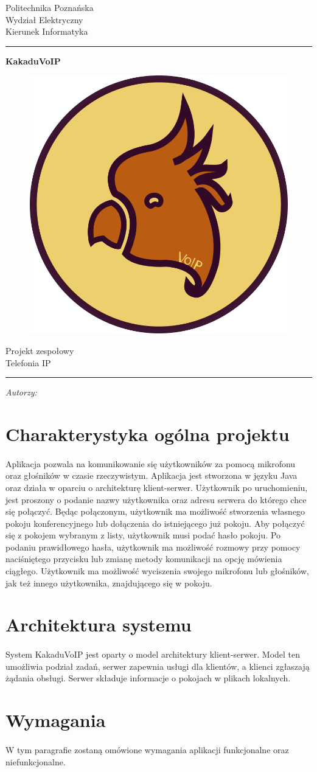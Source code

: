 \documentclass{article}
\author{\Large{Szymon Zieliński \\[0.2cm] szymon.r.zielinski@gmail.com \\[0.2cm] 126812\\[0.4cm] Oskar Rutkowski \\[0.2cm] oskar.rutkowski@student.put.poznan.pl \\[0.2cm] 126845} }
\makeatletter
\newcommand{\linia}{\rule{\linewidth}{0.5mm}}
\renewcommand{\maketitle}{\begin{titlepage}
		
		\vspace*{1cm}
		
		\begin{center}\small
			
			Politechnika Poznańska\\
			
			Wydział Elektryczny\\
			
			Kierunek Informatyka
			
		\end{center}
		
		\vspace{2cm}
		
		\linia
		
		\begin{center}
			
			\LARGE {\textbf{KakaduVoIP} \\[1cm]}
			\begin{figure}[h]
				\centering
				\includegraphics[scale=0.2]{Kakadu}
			\end{figure}
		  \LARGE {Projekt zespołowy  \\ Telefonia IP}
			
		\end{center}
		
		\linia
		
		\vspace{3cm}
		
		\begin{flushright}
			
			\begin{minipage}{15cm}
				
				\textit{ \Large{Autorzy:}}\\
				
				\normalsize{\@author} \par
				
			\end{minipage}
			
		\end{flushright}
		
		\vspace*{\stretch{6}}
		
		\begin{center}
			
			\@date
			
		\end{center}
		
	\end{titlepage}%
	
}
\makeatother
\begin{document}
	
	\maketitle
	\newpage
	\tableofcontents
	\newpage
	
	\section{Charakterystyka ogólna projektu}
	\paragraph*{} Aplikacja pozwala na komunikowanie się użytkowników za pomocą mikrofonu oraz głośników w czasie rzeczywistym. Aplikacja jest stworzona w języku Java oraz działa w oparciu o architekturę klient-serwer. Użytkownik po uruchomieniu, jest proszony o podanie nazwy użytkownika oraz adresu serwera  do którego chce się połączyć. Będąc połączonym, użytkownik ma możliwość stworzenia własnego pokoju konferencyjnego lub dołączenia do istniejącego już pokoju. Aby połączyć się z pokojem wybranym z listy, użytkownik musi podać hasło pokoju. Po podaniu prawidłowego hasła, użytkownik ma możliwość rozmowy przy pomocy naciśniętego przycisku lub zmianę metody komunikacji na opcję mówienia ciągłego. Użytkownik ma możliwość wyciszenia swojego mikrofonu lub głośników, jak też innego użytkownika, znajdującego się w pokoju.
	\section{Architektura systemu}
	\paragraph*{} System KakaduVoIP jest oparty o model architektury klient-serwer. Model ten umożliwia podział zadań, serwer zapewnia usługi dla klientów, a klienci zgłaszają żądania obsługi. Serwer składuje informacje o pokojach w plikach lokalnych.
	\section{Wymagania}
	\paragraph*{} W tym paragrafie zostaną omówione wymagania aplikacji funkcjonalne oraz niefunkcjonalne.
\end{document}
